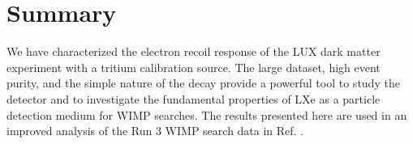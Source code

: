 \section{Summary}

We have characterized the electron recoil response of the LUX dark matter experiment with a tritium calibration source. The large dataset, high event purity, and the simple nature of the decay provide a powerful tool to study the detector and to investigate the fundamental properties of LXe as a particle detection medium for WIMP searches. The results presented here are used in an improved analysis of the Run 3 WIMP search data in Ref. \cite{lux-reanalysis}.